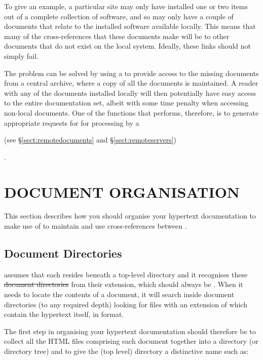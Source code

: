 To give an example, a particular site may only have installed one or
two items out of a complete collection of software, and so may only
have a couple of documents that relate to the installed software
available locally.  This means that many of the cross-references that
these documents make will be to other documents that do not exist on
the local system. Ideally, these links should not simply fail.

The problem can be solved by using a  to
provide access to the missing documents from a central archive, where
a copy of all the documents is maintained. A reader with any of the
documents installed locally will then potentially have easy access to
the entire documentation set, albeit with some time penalty when
accessing non-local documents. One of the functions that 
performs, therefore, is to generate appropriate requests for
 for processing by a \begin{latexonly}
(see \S\ref{sect:remotedocuments} and
\S\ref{sect:remoteservers})\end{latexonly}.

\section{DOCUMENT ORGANISATION}

This section describes how you should organise your hypertext
documentation to make use of  to maintain and use
cross-references between .

\subsection{\label{sect:documentdirectories}Document Directories}

 assumes that each  resides
beneath a top-level directory and it recognises these \st{document
directories} from their extension, which should always be .
When it needs to locate the contents of a document, it will search
inside document directories (to any required depth) looking for files
with an extension of  which contain the hypertext itself, in
 format.

The first step in organising your hypertext documentation should
therefore be to collect all the HTML files comprising each document
together into a directory (or directory tree) and to give the (top
level) directory a distinctive name such as:

